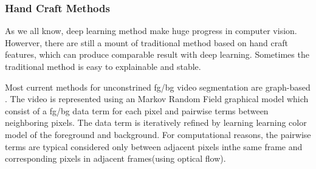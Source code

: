\subsubsection{Hand Craft Methods}

As we all know, deep learning method make huge progress in computer vision. Howerver, there are still a mount of traditional method based on 
hand craft features, which can produce comparable result with deep learning. Sometimes the traditional method is easy to explainable and stable.

Most current methods for unconstrined fg/bg video segmentation are graph-based \cite{Lee2011Key, Papazoglou2013Fast, zhang2013video}. The video
is represented using an Markov Random Field graphical model which consist of a fg/bg data term for each pixel and pairwise
terms between neighboring pixels. The data term is iteratively refined by learning learning color model of the foreground
and background. For computational reasons, the pairwise  terms are typical considered only between adjacent pixels inthe same 
frame and corresponding pixels in adjacent frames(using optical flow).







